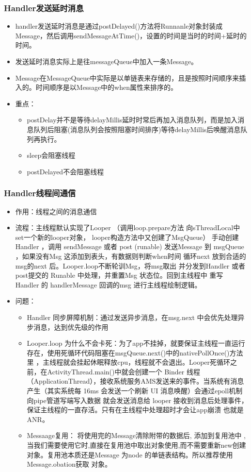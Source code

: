 \documentclass[9pt, b5paper]{article}
\begin{document}
\subsubsection{Handler发送延时消息}
\label{sec-2-3-6}
\begin{itemize}
\item handler发送延时消息是通过postDelayed()方法将Runnanle对象封装成Message，然后调用sendMessageAtTime()，设置的时间是当时的时间+延时的时间。
\item 发送延时消息实际上是往messageQueue中加入一条Message。
\item Message在MessageQueue中实际是以单链表来存储的，且是按照时间顺序来插入的。时间顺序是以Message中的when属性来排序的。
\item 重点：
\begin{itemize}
\item postDelay并不是等待delayMillis延时时常后再加入消息队列，而是加入消息队列后阻塞(消息队列会按照阻塞时间排序)等待delayMillis后唤醒消息队列再执行。
\item sleep会阻塞线程
\item postDelayed不会阻塞线程
\end{itemize}
\end{itemize}
\subsubsection{Handler线程间通信}
\label{sec-2-3-7}
\begin{itemize}
\item 作用：线程之间的消息通信
\item 流程：主线程默认实现了Looper （调用loop.prepare方法 向sThreadLocal中set一个新的looper对象， looper构造方法中又创建了MsgQueue） 手动创建Handler ，调用 sendMessage 或者 post (runable) 发送Message 到 msgQueue ，如果没有Msg 这添加到表头，有数据则判断when时间 循环next 放到合适的 msg的next 后。Looper.loop不断轮训Msg，将msg取出 并分发到Handler 或者 post提交的 Runable 中处理，并重置Msg 状态位。回到主线程中 重写 Handler 的 handlerMessage 回调的msg 进行主线程绘制逻辑。
\item 问题：
\begin{itemize}
\item Handler 同步屏障机制：通过发送异步消息，在msg.next 中会优先处理异步消息，达到优先级的作用
\item Looper.loop 为什么不会卡死：为了app不挂掉，就要保证主线程一直运行存在，使用死循环代码阻塞在msgQueue.next()中的nativePollOnce()方法里 ，主线程就会挂起休眠释放cpu，线程就不会退出。Looper死循环之前，在ActivityThread.main()中就会创建一个 Binder 线程（ApplicationThread），接收系统服务AMS发送来的事件。当系统有消息产生（其实系统每 16ms 会发送一个刷新 UI 消息唤醒）会通过epoll机制 向pipe管道写端写入数据 就会发送消息给 looper 接收到消息后处理事件，保证主线程的一直存活。只有在主线程中处理超时才会让app崩溃 也就是ANR。
\item Messaage复用： 将使用完的Message清除附带的数据后, 添加到复用池中 ,当我们需要使用它时,直接在复用池中取出对象使用,而不需要重新new创建对象。复用池本质还是Message 为node 的单链表结构。所以推荐使用Message.obation获取 对象。
\end{itemize}
\end{itemize}
\end{document}
